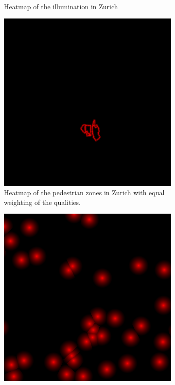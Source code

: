 \documentclass[letterpaper]{article}
\begin{document}
\begin{figure}[htb]
\begin{subfigure}[t]{.48\columnwidth}
        \caption[width=.9\linewidth]{Heatmap of the illumination in Zurich}
    \end{subfigure}\vspace{2mm}
    \begin{subfigure}[t]{.48\columnwidth}
        \centering
        \includegraphics[width=\linewidth]{images/results/pedestrian_zone_heatmap_70.png}
        \caption[width=.9\linewidth]{Heatmap of the pedestrian zones in Zurich with equal weighting of the qualities.}
    \end{subfigure}\hspace{0.03\columnwidth}
    \begin{subfigure}[t]{.48\columnwidth}
        \centering
        \includegraphics[width=\linewidth]{images/results/sighting_point_heatmap_500.png}

\end{subfigure}
\end{figure}
\end{document}
